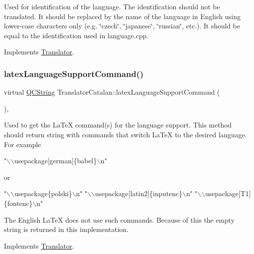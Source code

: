 Used for identification of the language. The identification should not be translated. It should be replaced by the name of the language in English using lower-\/case characters only (e.\+g. \char`\"{}czech\char`\"{}, \char`\"{}japanese\char`\"{}, \char`\"{}russian\char`\"{}, etc.). It should be equal to the identification used in language.\+cpp. 

Implements \mbox{\hyperlink{class_translator}{Translator}}.

\mbox{\label{class_translator_catalan_ac2b845cb9ea1dfc94a3eff4942cb58de}} 
\subsubsection{\texorpdfstring{latexLanguageSupportCommand()}{latexLanguageSupportCommand()}}
{\footnotesize\ttfamily virtual \mbox{\hyperlink{class_q_c_string}{Q\+C\+String}} Translator\+Catalan\+::latex\+Language\+Support\+Command (\begin{DoxyParamCaption}{ }\end{DoxyParamCaption})\hspace{0.3cm}{\ttfamily [inline]}, {\ttfamily [virtual]}}

Used to get the La\+TeX command(s) for the language support. This method should return string with commands that switch La\+TeX to the desired language. For example 
\begin{DoxyPre}"\(\backslash\)\(\backslash\)usepackage[german]\{babel\}\(\backslash\)n"
 \end{DoxyPre}
 or 
\begin{DoxyPre}"\(\backslash\)\(\backslash\)usepackage\{polski\}\(\backslash\)n"
 "\(\backslash\)\(\backslash\)usepackage[latin2]\{inputenc\}\(\backslash\)n"
 "\(\backslash\)\(\backslash\)usepackage[T1]\{fontenc\}\(\backslash\)n"
 \end{DoxyPre}


The English La\+TeX does not use such commands. Because of this the empty string is returned in this implementation. 

Implements \mbox{\hyperlink{class_translator}{Translator}}.

\mbox{\label{class_translator_catalan_a12f515d276ce620aba1f9ae1471836dc}} 
